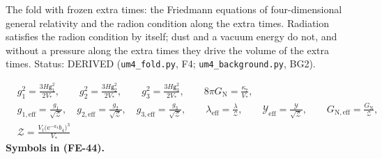 \documentclass[
  10pt,
]{article}
\begin{document}
The fold with frozen extra times: the Friedmann equations of
four-dimensional general relativity and the radion condition along the
extra times. Radiation satisfies the radion condition by itself; dust
and a vacuum energy do not, and without a pressure along the extra times
they drive the volume of the extra times. Status: DERIVED
(\texttt{um4\_fold.py}, F4; \texttt{um4\_background.py}, BG2).

\[
\begin{aligned}
&g_1^2 = \frac{3H\mathsf{g}_1^2}{2V_*},\qquad g_2^2 = \frac{3H\mathsf{g}_2^2}{2V_*},\qquad g_3^2 = \frac{3H\mathsf{g}_3^2}{2V_*},\qquad
 8\pi G_{\mathrm{N}} = \frac{\kappa_7}{V_*},\\
&g_{1,\mathrm{eff}} = \frac{g_1}{\sqrt{\mathcal{Z}}},\quad g_{2,\mathrm{eff}} = \frac{g_2}{\sqrt{\mathcal{Z}}},\quad g_{3,\mathrm{eff}} = \frac{g_3}{\sqrt{\mathcal{Z}}},\qquad \lambda_{\mathrm{eff}} = \frac{\lambda}{\mathcal{Z}},\qquad
 \mathcal{Y}_{\mathrm{eff}} = \frac{\mathcal{Y}}{\sqrt{\mathcal{Z}}},\qquad G_{\mathrm{N,eff}} = \frac{G_{\mathrm{N}}}{\mathcal{Z}},\\
&\mathcal{Z} = \frac{V_{\mathrm{t}}\big(\mathrm{e}^{-a_4}b_4\big)^3}{V_*}
\end{aligned} \tag{FE-44}
\] \textbf{Symbols in (FE-44).}
\end{document}
